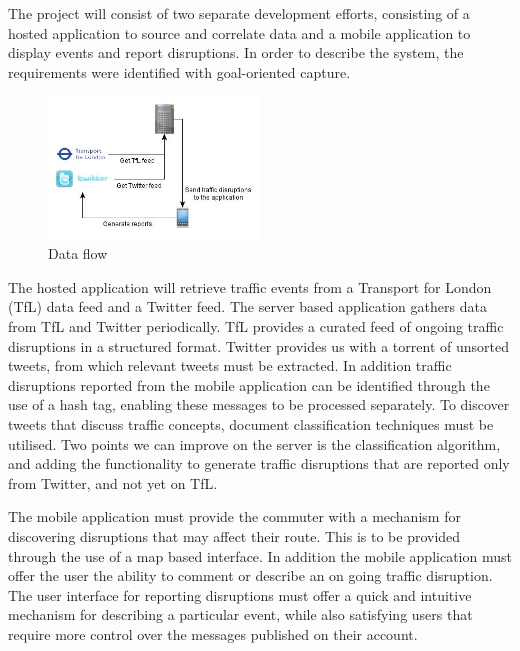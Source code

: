 The project will consist of two separate development efforts, consisting of a hosted application to source and correlate data and a mobile application to display events and report disruptions. In order to describe the system, the requirements were identified with goal-oriented capture\cite{Requirements}.

\begin{figure}[here]
\begin{center}
\includegraphics[width=0.5\textwidth]{images/draft_architecture.jpg}
\end{center}
\vspace{-20pt}
\caption{Data flow}
\end{figure}

The hosted application will retrieve traffic events from a Transport for London (TfL) data feed and a Twitter feed. The server based application gathers data from TfL and Twitter periodically. TfL provides a curated feed of ongoing traffic disruptions in a structured format. Twitter provides us with a torrent of unsorted tweets, from which relevant tweets must be extracted. In addition traffic disruptions reported from the mobile application can be identified through the use of a hash tag, enabling these messages to be processed separately. To discover tweets that discuss traffic concepts, document classification techniques must be utilised. Two points we can improve on the server is the classification algorithm, and adding the functionality to generate traffic disruptions that are reported only from Twitter, and not yet on TfL.

The mobile application must provide the commuter with a mechanism for discovering disruptions that may affect their route. This is to be provided through the use of a map based interface. In addition the mobile application must offer the user the ability to comment or describe an on going traffic disruption. The user interface for reporting disruptions must offer a quick and intuitive mechanism for describing a particular event, while also satisfying users that require more control over the messages published on their account.

